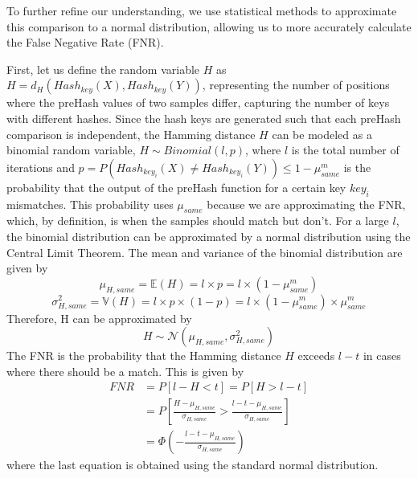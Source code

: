 To further refine our understanding, we use statistical methods to approximate this comparison to a normal distribution, allowing us to more accurately calculate the False Negative Rate (FNR). %


First, let us define the random variable $H$ as \(H = d_H(Hash_{key}(X), Hash_{key}(Y))\), representing the number of positions where the preHash values of two samples differ, capturing the number of keys with different hashes. Since the hash keys are generated such that each preHash comparison is independent, the Hamming distance $H$ can be modeled as a binomial random variable, \(H \sim Binomial(l, p)\), where $l$ is the total number of iterations and $p = P(Hash_{key_i}(X) \neq Hash_{key_i}(Y)) \leq 1 - \mu_{same}^m$ is the probability that the output of the preHash function for a certain key $key_i$ mismatches. This probability uses $\mu_{same}$ because we are approximating the FNR, which, by definition, is when the samples should match but don't. 
\newline For a large $l$, the binomial distribution can be approximated by a normal distribution using the Central Limit Theorem. The mean and variance of the binomial distribution are given by
\[
\mu_{H, same} = \mathbb{E}(H) = l \times p = l \times (1 - \mu_{same}^m)    
\]
\[
\sigma_{H, same}^2 = \mathbb{V}(H) = l \times p \times (1 - p) = l \times (1 - \mu_{same}^m) \times \mu_{same}^m    
\]
Therefore, H can be approximated by
\[
H \sim \mathcal{N}(\mu_{H, same}, \sigma_{H, same}^2)    
\]
The FNR is the probability that the Hamming distance $H$ exceeds $l - t$ in cases where there should be a match. This is given by
\begin{equation}
    \begin{aligned}
        FNR &= P[l - H < t] = P[H > l - t] \\
        &= P\left[\frac{H - \mu_{H, same}}{\sigma_{H, same}} > \frac{l - t - \mu_{H, same}}{\sigma_{H, same}}\right] \\
        &= \Phi \left( - \frac{l - t - \mu_{H, same}}{\sigma_{H, same}}\right)
    \end{aligned}        
\end{equation}
where the last equation is obtained using the standard normal distribution. 

